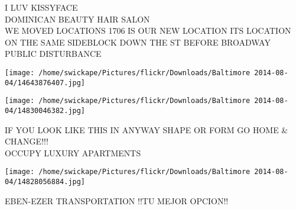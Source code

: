 \documentclass[10pt,letterpaper]{article}
\begin{document}
I LUV KISSYFACE\\
DOMINICAN BEAUTY HAIR SALON\\
WE MOVED LOCATIONS 1706 IS OUR NEW LOCATION ITS LOCATION ON THE SAME SIDEBLOCK DOWN THE ST BEFORE BROADWAY\\
PUBLIC DISTURBANCE
\pagebreak

\texttt{[image: /home/swickape/Pictures/flickr/Downloads/Baltimore 2014-08-04/14643876407.jpg]}

\vspace{0.25in}
\texttt{[image: /home/swickape/Pictures/flickr/Downloads/Baltimore 2014-08-04/14830046382.jpg]}

IF YOU LOOK LIKE THIS IN ANYWAY SHAPE OR FORM GO HOME \& CHANGE!!!\\
OCCUPY LUXURY APARTMENTS
\pagebreak

\texttt{[image: /home/swickape/Pictures/flickr/Downloads/Baltimore 2014-08-04/14828056884.jpg]}

EBEN{-}EZER TRANSPORTATION  !!TU MEJOR OPCION!!
\pagebreak
\end{document}
